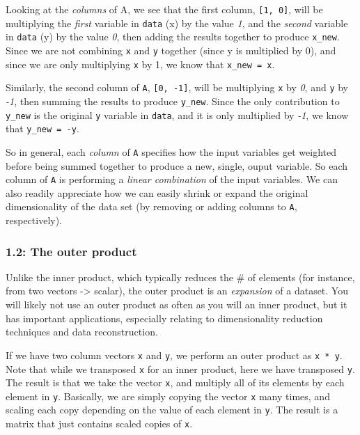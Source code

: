 \documentclass[11pt]{article}
\begin{document}
Looking at the \emph{columns} of A, we see that the first column,
\texttt{{[}1,\ 0{]}}, will be multiplying the \emph{first} variable in
\texttt{data} (x) by the value \emph{1}, and the \emph{second} variable
in \texttt{data} (y) by the value \emph{0}, then adding the results
together to produce \texttt{x\_new}. Since we are not combining
\texttt{x} and \texttt{y} together (since y is multiplied by 0), and
since we are only multiplying \texttt{x} by 1, we know that
\texttt{x\_new\ =\ x}.

Similarly, the second column of \texttt{A}, \texttt{{[}0,\ -1{]}}, will
be multiplying \texttt{x} by \emph{0}, and \texttt{y} by \emph{-1}, then
summing the results to produce \texttt{y\_new}. Since the only
contribution to \texttt{y\_new} is the original \texttt{y} variable in
\texttt{data}, and it is only multiplied by \emph{-1}, we know that
\texttt{y\_new\ =\ -y}.

So in general, each \emph{column} of \texttt{A} specifies how the input
variables get weighted before being summed together to produce a new,
single, ouput variable. So each column of \texttt{A} is performing a
\emph{linear combination} of the input variables. We can also readily
appreciate how we can easily shrink or expand the original
dimensionality of the data set (by removing or adding columns to
\texttt{A}, respectively).

    \hypertarget{the-outer-product}{%
\subsubsection{1.2: The outer product }\label{the-outer-product}}

Unlike the inner product, which typically reduces the \# of elements
(for instance, from two vectors -\textgreater{} scalar), the outer
product is an \emph{expansion} of a dataset. You will likely not use an
outer product as often as you will an inner product, but it has
important applications, especially relating to dimensionality reduction
techniques and data reconstruction.

If we have two column vectors \texttt{x} and \texttt{y}, we perform an
outer product as \texttt{x\ *\ y\textquotesingle{}}. Note that while we
transposed \texttt{x} for an inner product, here we have transposed
\texttt{y}. The result is that we take the vector \texttt{x}, and
multiply all of its elements by each element in \texttt{y}. Basically,
we are simply copying the vector \texttt{x} many times, and scaling each
copy depending on the value of each element in \texttt{y}. The result is
a matrix that just contains scaled copies of \texttt{x}.
\end{document}
